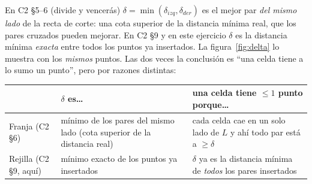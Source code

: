 \documentclass[11pt]{article}
\begin{document}
En C2 §5--6 (divide y vencerás) $\delta=\min(\delta_{izq},\delta_{der})$ es el mejor par \emph{del mismo
lado} de la recta de corte: una cota superior de la distancia mínima real, que los pares cruzados pueden
mejorar. En C2 §9 y en este ejercicio $\delta$ es la distancia mínima \emph{exacta} entre todos los puntos
ya insertados. La figura~\ref{fig:delta} lo muestra con los \emph{mismos} puntos. Las dos veces la conclusión
es ``una celda tiene a lo sumo un punto'', pero por razones distintas:
\begin{center}\small
\begin{tabular}{@{}p{3.2cm}p{5.6cm}p{5.8cm}@{}}
\toprule
 & \textbf{$\delta$ es\ldots} & \textbf{una celda tiene $\le1$ punto porque\ldots}\\
\midrule
Franja (C2 §6) & mínimo de los pares del mismo lado (cota superior de la distancia real) &
cada celda cae en un solo lado de $L$ y ahí todo par está a $\ge\delta$\\
Rejilla (C2 §9, aquí) & mínimo exacto de los puntos ya insertados & $\delta$ ya es la distancia mínima
de \emph{todos} los pares insertados\\
\bottomrule
\end{tabular}
\end{center}
\end{document}
